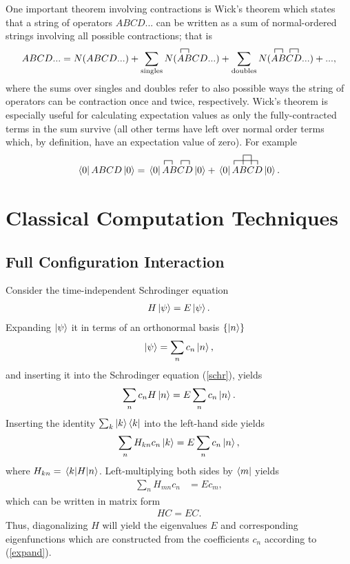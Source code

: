 \documentclass[Dual]{msu-thesis}
\begin{document}
One important theorem involving contractions is Wick's theorem \cite{ref:wick} which states that a string of operators $ABCD...$ can be written as a sum of normal-ordered strings involving all possible contractions; that is
\begin{align}
ABCD...
=
N(ABCD...)
+
\sum_{\text{singles}}
\contraction{N(}{A}{}{B}
N(ABCD...)
+
\sum_{\text{doubles}}
\contraction{N(}{A}{}{B}
\contraction{N(AB}{C}{}{D}
N(ABCD...)
+
...,
\end{align}
where the sums over singles and doubles refer to also possible ways the string of operators can be contraction once and twice, respectively. Wick's theorem is especially useful for calculating expectation values as only the fully-contracted terms in the sum survive (all other terms have left over normal order terms which, by definition, have an expectation value of zero). For example
\begin{align}
\bra{0}ABCD\ket{0}
=
\contraction{\bra{0}}{A}{}{B}
\contraction{\bra{0}AB}{C}{}{D}
\bra{0}ABCD\ket{0}
+
\contraction{\bra{0}}{A}{BC}{D}
\contraction[1em]{\bra{0}A}{B}{}{C}
\bra{0}ABCD\ket{0}.
\end{align}

\section{Classical Computation Techniques}

\subsection{Full Configuration Interaction}
\label{fci_subsection}

Consider the time-independent Schrodinger equation
\begin{align}
\label{schr}
H\ket{\psi}=E\ket{\psi}.
\end{align}
Expanding $\ket{\psi}$ it in terms of an orthonormal basis $\{\ket{n}\}$
\begin{align}
\label{expand}
\ket{\psi}=\sum_nc_n\ket{n},
\end{align}
and inserting it into the Schrodinger equation (\ref{schr}), yields
\begin{align}
\sum_nc_nH\ket{n}=E\sum_nc_n\ket{n}.
\end{align}
Inserting the identity $\sum_k\ket{k}\bra{k}$ into the left-hand side yields
\begin{align}
\sum_nH_{kn}c_n\ket{k}=E\sum_nc_n\ket{n},
\end{align}
where $H_{kn}=\mel{k}{H}{n}$. Left-multiplying both sides by $\bra{m}$ yields
\begin{align}
\sum_nH_{mn}c_n&=Ec_m,
\end{align}
which can be written in matrix form
\begin{align}
HC=EC.
\end{align}
Thus, diagonalizing $H$ will yield the eigenvalues $E$ and corresponding eigenfunctions which are constructed from the coefficients $c_n$ according to (\ref{expand}).
\end{document}
